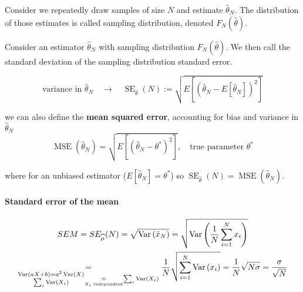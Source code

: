 Consider we repeatedly draw samples of size $N$ and estimate $\hat{\theta}_N$. The distribution of
those estimates is called sampling distribution, denoted $F_N(\hat{\theta})$.

Consider an estimator $\hat{\theta}_N$ with sampling distribution $F_N(\hat{\theta})$. We then call
the standard deviation of the sampling distribution standard error.

\begin{equation}
    \text{variance in } \hat{\theta}_N \quad \rightarrow \quad \operatorname{SE}_{\hat{\theta}}(N) := \sqrt{E[(\hat{\theta}_N - E[\hat{\theta}_N])^2]}
\end{equation}

we can also define the \textbf{mean squared error}, accounting for bias and variance in $\hat{\theta}_N$
\begin{equation}
    \operatorname{MSE}(\hat{\theta}_N) = \sqrt{E\left[ (\hat{\theta}_N - \theta^*)^2 \right]}, \quad \text{true parameter } \theta^*
\end{equation}

where for an unbiased estimator ($E[\hat{\theta}_N] = \theta^*$) so $\operatorname{SE}_{\hat{\theta}}(N) = \operatorname{MSE}(\hat{\theta}_N)$.

\paragraph*{Standard error of the mean}
\begin{equation}
    \begin{gathered}
        S E M=S E_{\widehat{\mu}}(N)=\sqrt{\operatorname{Var}\left(\bar{x}_N\right)}=\sqrt{\operatorname{Var}\left(\frac{1}{N} \sum_{i=1}^N x_i\right)} \\
        \underset{\substack{\operatorname{Var}(a X+b)=a^2 \operatorname{Var}(X) \\
        \sum_i \operatorname{Var}\left(X_i\right)} \underset{X_i \text{ independent}}{=} \sum_i \operatorname{Var}(X_i)}{=} \frac{1}{N} \sqrt{\sum_{i=1}^N \operatorname{Var}\left(x_i\right)}=\frac{1}{N} \sqrt{N \sigma}=\frac{\sigma}{\sqrt{N}}
    \end{gathered}     
\end{equation}



